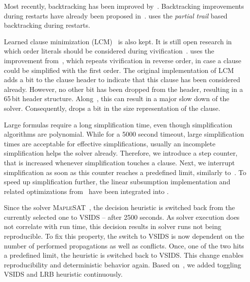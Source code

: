 \documentclass[conference]{IEEEtran}
\begin{document}
Most recently, backtracking has been improved by~\cite{10.1007/978-3-319-94144-8_7}.
Backtracking improvements during restarts have already been proposed in~\cite{10.1007/978-3-642-21581-0_18}.
\mergesat uses the \emph{partial trail} based backtracking during restarts.

Learned clause minimization (LCM)~\cite{ijcai2017-98} is also kept.
It is still open research in which order literals should be considered during vivification~\cite{DBLP:conf/ecai/PietteHS08}.
\mergesat uses the improvement from~\cite{riss71}, which repeats vivification in reverse order, in case a clause could be simplified with the first order.
The original implementation of LCM adds a bit to the clause header to indicate that this clause has been considered already.
However, no other bit has been dropped from the header, resulting in a 65\,bit header structure.
Along~\cite{HolldoblerMS:2010}, this can result in a major slow down of the solver.
Consequently, \mergesat drops a bit in the size representation of the clause.

Large formulas require a long simplification time, even though simplification algorithms are polynomial.
While for a 5000 second timeout, large simplification times are acceptable for effective simplifications, usually an incomplete simplification helps the solver already.
Therefore, we introduce a step counter, that is increased whenever simplification touches a clause.
Next, we interrupt simplification as soon as this counter reaches a predefined limit, similarly to~\cite{precosat}.
To speed up simplification further, the linear subsumption implementation and related optimizations from~\cite{POS-18:Tuning_Parallel_SAT_Solvers} have been integrated into \mergesat.

Since the solver \textsc{MapleSAT}~\cite{MapleSAT}, the decision heuristic is switched back from the currently selected one to VSIDS -- after 2500 seconds.
As solver execution does not correlate with run time, this decision results in solver runs not being reproducible.
To fix this property, the switch to VSIDS is now dependent on the number of performed propagations as well as conflicts.
Once, one of the two hits a predefined limit, the heuristic is switched back to VSIDS.
This change enables reproducibility and deterministic behavior again.
Based on~\cite{MapleLCMDistChronoBTDL}, we added toggling VSIDS and LRB heuristic continuously.
\end{document}
